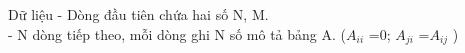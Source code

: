 Dữ liệu
- Dòng đầu tiên chứa hai số N, M.   
\\   - N dòng tiếp theo, mỗi dòng ghi N số mô tả bảng A. ($A_{ii}$   =0; $A_{ji}$   =$A_{ij}$   )